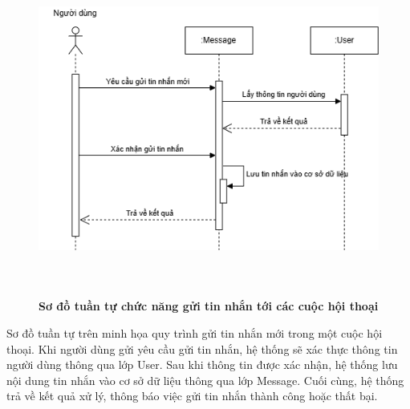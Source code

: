 \begin{figure}[H]
	\centering
	\includegraphics[width=14cm,height=11cm]{Images/sequence/chat/send.drawio.png}
	\caption[Sơ đồ tuần tự chức năng gửi tin nhắn tới các cuộc hội thoại]{\bfseries \fontsize{12pt}{0pt}
		\selectfont Sơ đồ tuần tự chức năng gửi tin nhắn tới các cuộc hội thoại}
	\label{sequence_send} %
\end{figure}
Sơ đồ tuần tự trên minh họa quy trình gửi tin nhắn mới trong một cuộc hội thoại. Khi người dùng gửi yêu cầu gửi tin nhắn, hệ thống sẽ xác thực thông tin người dùng thông qua lớp User.
Sau khi thông tin được xác nhận, hệ thống lưu nội dung tin nhắn vào cơ sở dữ liệu thông qua lớp Message. Cuối cùng, hệ thống trả về kết quả xử lý, thông báo việc gửi tin nhắn thành công hoặc thất bại.

